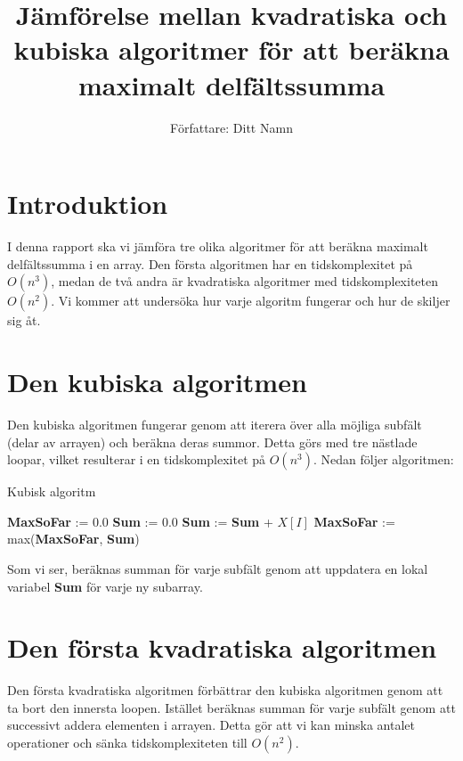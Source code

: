 \documentclass{article}
\begin{document}
\title{Jämförelse mellan kvadratiska och kubiska algoritmer för att beräkna maximalt delfältssumma}
\author{Författare: Ditt Namn}
\date{}
\maketitle

\section{Introduktion}
I denna rapport ska vi jämföra tre olika algoritmer för att beräkna maximalt delfältssumma i en array. Den första algoritmen har en tidskomplexitet på \( O(n^3) \), medan de två andra är kvadratiska algoritmer med tidskomplexiteten \( O(n^2) \). Vi kommer att undersöka hur varje algoritm fungerar och hur de skiljer sig åt.

\section{Den kubiska algoritmen}
Den kubiska algoritmen fungerar genom att iterera över alla möjliga subfält (delar av arrayen) och beräkna deras summor. Detta görs med tre nästlade loopar, vilket resulterar i en tidskomplexitet på \( O(n^3) \). Nedan följer algoritmen:

\begin{algorithm}
\caption{Kubisk algoritm}
\begin{algorithmic}[1]
\State \textbf{MaxSoFar} := 0.0
        \State \textbf{Sum} := 0.0
            \State \textbf{Sum} := \textbf{Sum} + $X[I]$
        \EndFor
        \State \textbf{MaxSoFar} := max(\textbf{MaxSoFar}, \textbf{Sum})
    \EndFor
\EndFor
\end{algorithmic}
\end{algorithm}

Som vi ser, beräknas summan för varje subfält genom att uppdatera en lokal variabel \textbf{Sum} för varje ny subarray.

\section{Den första kvadratiska algoritmen}
Den första kvadratiska algoritmen förbättrar den kubiska algoritmen genom att ta bort den innersta loopen. Istället beräknas summan för varje subfält genom att successivt addera elementen i arrayen. Detta gör att vi kan minska antalet operationer och sänka tidskomplexiteten till \( O(n^2) \).
\end{document}
